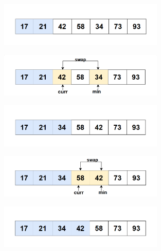 \begin{itemize}
\begin{figure}[H]
\end{figure}

\begin{figure}[H]
    \centering
    \includegraphics[width=0.7\textwidth]{img/selection sort/5.png} 
\end{figure}

\begin{figure}[H]
    \centering
    \includegraphics[width=0.7\textwidth]{img/selection sort/6.png} 
\end{figure}

\begin{figure}[H]
    \centering
    \includegraphics[width=0.7\textwidth]{img/selection sort/7.png} 
\end{figure}

\begin{figure}[H]
    \centering
    \includegraphics[width=0.7\textwidth]{img/selection sort/8.png} 
\end{figure}

\begin{figure}[H]
    \centering
    \includegraphics[width=0.7\textwidth]{img/selection sort/9.png} 
\end{figure}


\end{itemize}
